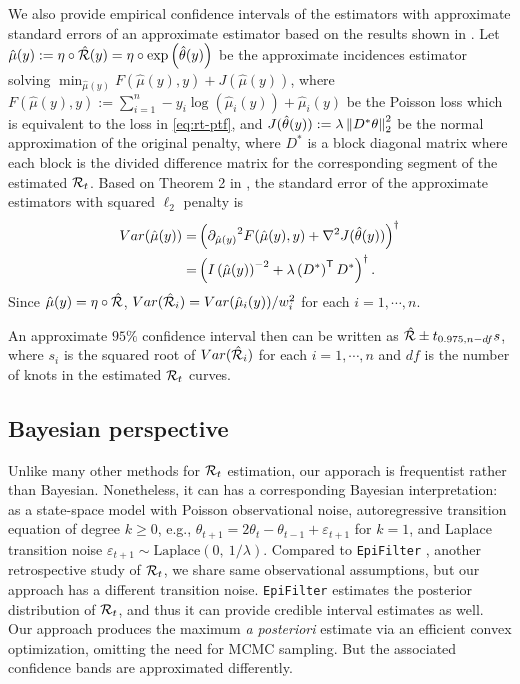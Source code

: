 We also provide empirical confidence intervals of the estimators with approximate 
standard errors of an approximate estimator based on the results shown in \cite{vaiter2017degrees}. 
Let $\hat{\mu}(y) := \eta\circ \hat{\mathcal{R}}(y) = \eta\circ \exp\left(\hat{\theta}(y)\right)$ 
be the approximate incidences estimator solving 
$\min_{\hat{\mu}(y)} F(\hat{\mu}(y), y) + J(\hat{\mu}(y))$, where  
$F(\hat{\mu}(y), y):=\sum_{i=1}^n -y_i \log(\hat{\mu}_i(y)) + \hat{\mu}_i(y)$ be 
the Poisson loss which is equivalent to the loss in \eqref{eq:rt-ptf}, and 
$J(\hat{\theta}(y)) := \lambda \left\lVert D^{\ast} \theta \right\rVert_2^2$ be the normal 
approximation of the original penalty, where $D^{\ast}$ is a block diagonal matrix 
where each block is the divided difference matrix for the corresponding segment of 
the estimated $\mathcal{R}_t$. Based on Theorem 2 in \cite{vaiter2017degrees}, the 
standard error of the approximate estimators with squared $\ell_2$ penalty is 
\begin{align}
  Var(\hat{\mu}(y)) =& \left( {\partial_{\hat{\mu}(y)}}^2 F(\hat{\mu}(y), y) + \nabla^2 J(\hat{\theta}(y))\right)^{\dagger} \\
  =& \left(I\left(\hat{\mu}(y)\right)^{-2} + \lambda \left(D^{\ast}\right)^{\mathsf{T}} D^{\ast}\right)^{\dagger}.
\end{align} 
Since $\hat{\mu}(y) = \eta\circ \hat{\mathcal{R}}$, $Var(\hat{\mathcal{R}}_i) = Var(\hat{\mu}_i(y)) / w_i^2$ 
for each $i = 1, \cdots, n$. 

An approximate $95\%$ confidence interval then can be written as $\hat{\mathcal{R}} \pm t_{0.975, n-df} s$, 
where $s_i$ is the squared root of $Var(\hat{\mathcal{R}}_i)$ for each $i = 1, \cdots, n$ 
and $df$ is the number of knots in the estimated $\mathcal{R}_t$ curves. 

\subsection{Bayesian perspective}

Unlike many other methods for $\mathcal{R}_t$ estimation, our apporach is frequentist
rather than Bayesian. Nonetheless, it can has a corresponding Bayesian
interpretation: as a state-space model with Poisson observational noise,
autoregressive transition equation of degree $k\geq 0$, e.g., $\theta_{t+1} =
2\theta_t - \theta_{t-1} + \varepsilon_{t+1}$ for $k=1$, and Laplace transition
noise $\varepsilon_{t+1}\sim \mathrm{Laplace}(0,\ 1/\lambda)$. Compared to
\texttt{EpiFilter} \citep{parag2021improved}, another retrospective study of
$\mathcal{R}_t$, we share same observational assumptions, but our approach has a
different transition noise. \texttt{EpiFilter} estimates the posterior
distribution of
$\mathcal{R}_t$, and thus it can provide credible interval estimates as well. Our
approach produces the maximum \emph{a posteriori} estimate via an efficient
convex optimization, omitting the need for MCMC sampling. But the associated
confidence bands are approximated differently.
